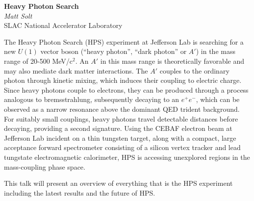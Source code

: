 \documentclass[12pt]{article}
\begin{document}
	\begin{center}
		\textbf{Heavy Photon Search} \\
		\emph{Matt Solt}				            \\
		SLAC National Accelerator Laboratory    	\\
	\end{center}


    The Heavy Photon Search (HPS) experiment at Jefferson Lab is searching 
    for a new $U(1)$ vector boson (``heavy photon'', ``dark photon'' or $A'$)
    in the mass range of 20-500 MeV/c$^{2}$. An $A'$ in this mass range is
    theoretically favorable and may also mediate dark matter interactions.  
    The $A'$ couples to the ordinary photon through kinetic mixing, which 
    induces their coupling to electric charge. Since heavy photons couple to
    electrons, they can be produced through a process analogous to 
    bremsstrahlung, subsequently decaying to an $e^{+}e^{-}$, which can be
    observed as a narrow resonance above the dominant QED trident background.
    For suitably small couplings, heavy photons travel detectable distances
    before decaying, providing a second signature. Using the CEBAF electron
    beam at Jefferson Lab incident on a thin tungsten target, along with a 
    compact, large acceptance forward spectrometer consisting of a silicon
    vertex tracker and lead tungstate electromagnetic calorimeter, HPS is 
    accessing unexplored regions in the mass-coupling phase space. 

    This talk will present an overview of everything that is the HPS 
    experiment including the latest results and the future of HPS.
\end{document}

